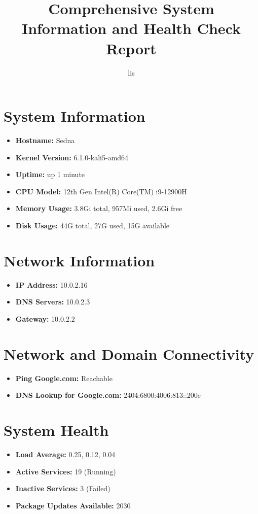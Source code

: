 \documentclass{article}
\title{Comprehensive System Information and Health Check Report}
\author{lis}
\begin{document}
\maketitle

\section*{System Information}
\begin{itemize}
  \item \textbf{Hostname:} Sedna
  \item \textbf{Kernel Version:} 6.1.0-kali5-amd64
  \item \textbf{Uptime:} up 1 minute
  \item \textbf{CPU Model:}                      12th Gen Intel(R) Core(TM) i9-12900H
  \item \textbf{Memory Usage:} 3.8Gi total, 957Mi used, 2.6Gi free
  \item \textbf{Disk Usage:} 44G total, 27G used, 15G available
\end{itemize}

\section*{Network Information}
\begin{itemize}
  \item \textbf{IP Address:} 10.0.2.16
  \item \textbf{DNS Servers:} 10.0.2.3
  \item \textbf{Gateway:} 10.0.2.2
\end{itemize}

\section*{Network and Domain Connectivity}
\begin{itemize}
  \item \textbf{Ping Google.com:} Reachable
  \item \textbf{DNS Lookup for Google.com:} 2404:6800:4006:813::200e
\end{itemize}

\section*{System Health}
\begin{itemize}
  \item \textbf{Load Average:} 0.25, 0.12, 0.04
  \item \textbf{Active Services:} 19 (Running)
  \item \textbf{Inactive Services:} 3 (Failed)
  \item \textbf{Package Updates Available:} 2030
\end{itemize}
\end{document}
